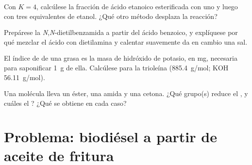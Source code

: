 \begin{exercise}[$\star\star$]\label{exo:b2:acyl-substitution:9}
Con $K = 4$, calcúlese la fracción de ácido etanoico esterificada con uno y luego con tres
equivalentes de etanol. ¿Qué otro método desplaza la reacción?
\end{exercise}

\begin{exercise}[$\star\star\star$]\label{exo:b2:acyl-substitution:10}
Prepárese la \textit{N},\textit{N}-dietilbenzamida a partir del ácido benzoico, y explíquese por qué mezclar el ácido
con dietilamina y calentar suavemente da en cambio una sal.
\end{exercise}

\begin{exercise}[$\star\star\star$]\label{exo:b2:acyl-substitution:11}
El índice de  de una grasa es la masa de hidróxido de potasio, en mg, necesaria para saponificar
\qty{1}{g} de ella. Calcúlese para la trioleína (\qty{885.4}{g/mol}; KOH \qty{56.11}{g/mol}).
\end{exercise}

\begin{exercise}[$\star\star\star$]\label{exo:b2:acyl-substitution:12}
Una molécula lleva un éster, una amida y una cetona. ¿Qué grupo(s) reduce el , y cuáles
el ? ¿Qué se obtiene en cada caso?
\end{exercise}

\section{Problema: biodiésel a partir de aceite de fritura}

